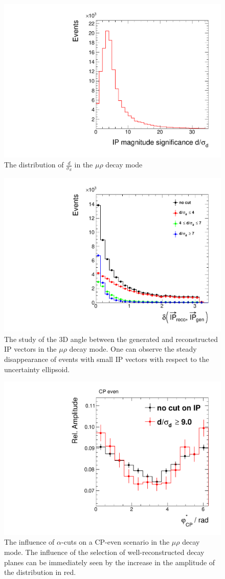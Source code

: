 \begin{figure}[h]
	\centering
	\includegraphics[width=0.6\linewidth]{Figures/IP_mag_IP_Over_err.pdf}
	\caption{The distribution of $\frac{d}{\sigma_d}$ in the $\mu \rho$ decay mode}
	\label{fig:IP_magOverLambda_dist}
\end{figure}
\begin{figure}[h]
	\centering
	\includegraphics[width=0.7\linewidth]{Figures/deltaGenRecoIP1.pdf}
	\caption{The study of the 3D angle between the generated and reconstructed IP vectors in the $\mu\rho$ decay mode. One can observe the steady disappearance of events with small IP vectors with respect to the uncertainty ellipsoid.}
	\label{fig:lambdacuts_angles}
\end{figure}
\begin{figure}[h]
	\centering
	\includegraphics[width=0.7\linewidth]{Figures/recoPhiStarCPCombMerged_norefit_CPeven.pdf}
	\caption{The influence of $\alpha$-cuts on a CP-even scenario in the $\mu\rho$ decay mode. The influence of the selection of well-reconstructed decay planes can be immediately seen by the increase in the amplitude of the distribution in red.}
	\label{fig:lambdacuts_CP}
\end{figure}\\
